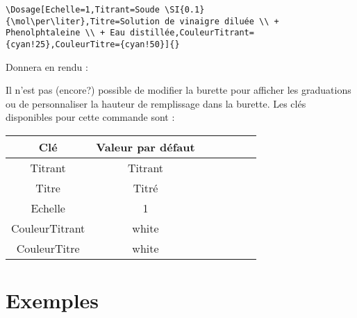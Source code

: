 \documentclass[a4paper,12pt,dvipsnames]{report}
\newcommand{\crh}{\\ \hline}
\begin{document}
\begin{lstlisting}[style=A]
\Dosage[Echelle=1,Titrant=Soude \SI{0.1}{\mol\per\liter},Titre=Solution de vinaigre diluée \\ + Phenolphtaleine \\ + Eau distillée,CouleurTitrant={cyan!25},CouleurTitre={cyan!50}]{}
\end{lstlisting}
\vspace{1cm}

Donnera en rendu :
\begin{center}
\Dosage[Echelle=1,Titrant=Soude \SI{0.1}{\mol\per\liter},Titre=Solution de vinaigre diluée \\ + Phenolphtaleine \\ + Eau distillée,CouleurTitrant={cyan!25},CouleurTitre={cyan!50}]{}
\end{center}

Il n'est pas (encore?) possible de modifier la burette pour afficher les graduations ou de personnaliser la hauteur de remplissage dans la burette. Les clés disponibles pour cette commande sont :
\begin{center}
\begin{tabularx}{0.5\textwidth}{|C|C|}
\hline 
\textbf{Clé} & \textbf{Valeur par défaut} \crh
Titrant & Titrant \crh
Titre & Titré \crh
Echelle & 1 \crh
CouleurTitrant & white \crh
CouleurTitre & white \crh
\end{tabularx}
\end{center}
\newpage
\thispagestyle{fancy}
\chapter{Exemples}
\thispagestyle{fancy}
\end{document}
